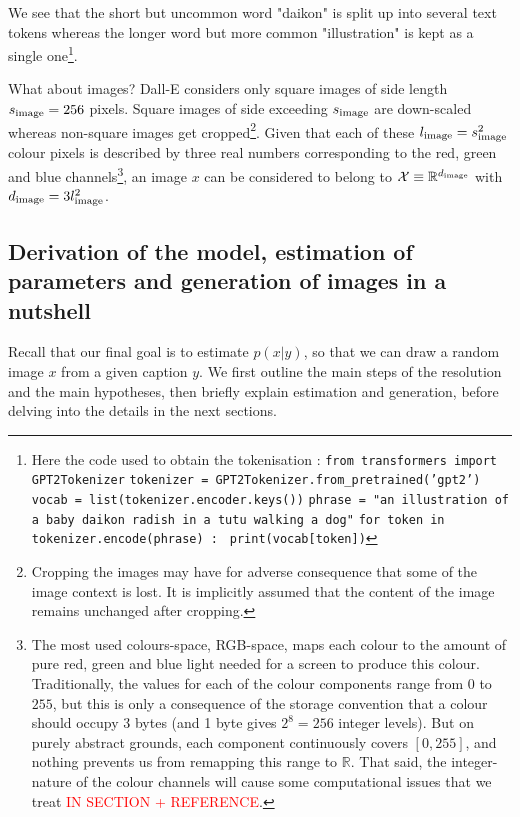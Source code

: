 \documentclass{article}
\begin{document}
\begin{appendix}
We see that the short but uncommon word "daikon" is split up into several text tokens whereas the longer word but more common "illustration" is kept as a single one\footnote{Here the code used to obtain the tokenisation :
\newline \texttt{from transformers import GPT2Tokenizer}
\newline \texttt{tokenizer = GPT2Tokenizer.from_pretrained('gpt2')}
\newline \texttt{vocab     = list(tokenizer.encoder.keys())}
\newline \texttt{phrase    = "an illustration of a baby daikon radish in a tutu walking a dog"}
\newline \texttt{for token in tokenizer.encode(phrase) :}
\newline \texttt{    print(vocab[token])}
}. 

What about images?
Dall-E considers only square images of side length $s_{\mathrm{image}}=256$ pixels.
Square images of side exceeding $s_{\mathrm{image}}$ are down-scaled whereas non-square images get cropped\footnote{
Cropping the images may have for adverse consequence that some of the image context is lost. It is implicitly assumed that the content of the image remains unchanged after cropping.
}.
Given that each of these $l_{\mathrm{image}}=s_{\mathrm{image}}^2$ colour pixels is described by three real numbers corresponding to the red, green and blue channels\footnote{
The most used colours-space, RGB-space, maps each colour to the amount of pure red, green and blue light needed for a screen to produce this colour. Traditionally, the values for each of the colour components range from 0 to $255$, but this is only a consequence of the storage convention that a colour should occupy 3 bytes (and 1 byte gives $2^8=256$ integer levels). But on purely abstract grounds, each component continuously covers $[0,255]$, and nothing prevents us from remapping this range to $\mathbb{R}$.
That said, the integer-nature of the colour channels will cause some computational issues that we treat \textcolor{red}{IN SECTION + REFERENCE}.
}, an image $x$ can be considered to belong to $\mathcal{X}\equiv \mathbb{R}^{d_{\mathrm{image}}}$ with $d_{\mathrm{image}}=3l_{\mathrm{image}}^2$.

\subsection{Derivation of the model, estimation of parameters and generation of images in a nutshell}

Recall that our final goal is to estimate $p(x|y)$, so that we can draw a random image $x$ from a given caption $y$. We first outline the main steps of the resolution and the main hypotheses, then briefly explain estimation and generation, before delving into the details in the next sections.


\end{appendix}
\end{document}
